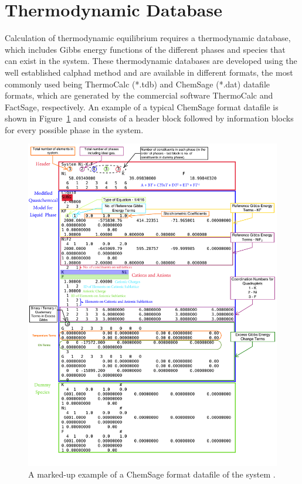 \section{Thermodynamic Database}
	Calculation of thermodynamic equilibrium requires a thermodynamic database, which includes Gibbs energy functions of the different phases and species that can exist in the system. These thermodynamic databases are developed using the well established \gls{calphad} method \cite{Kaufman:1970aa} and are available in different formats, the most commonly used being ThermoCalc (*.tdb) and ChemSage (*.dat) datafile formats, which are generated by the commercial software ThermoCalc and FactSage, respectively. An example of a typical ChemSage format datafile is shown in Figure~\ref{fig:datfile} and consists of a header block followed by information blocks for every possible phase in the system.
	\begin{figure}[htbp]
	 	\centering
	   	\includegraphics[width=\textwidth]{figures/chapter-6/NiKF.pdf}
	   	\caption[A marked-up example of a ChemSage format datafile of the  system.]{A marked-up example of a ChemSage format datafile of the  system \cite{OcadizFlores18}.}
	   	\label{fig:datfile}
	\end{figure}

